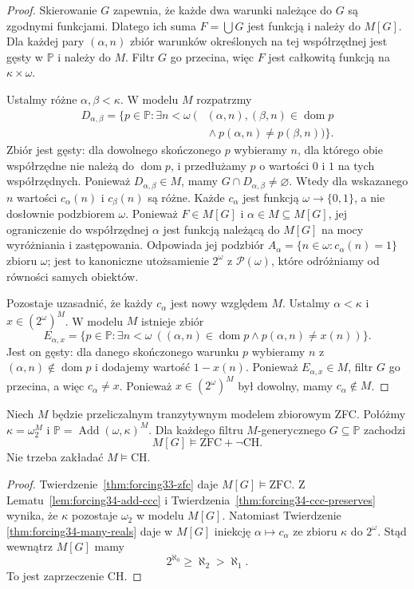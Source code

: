 \begin{proof}
Skierowanie $G$ zapewnia, że
każde dwa warunki należące
do $G$ są zgodnymi funkcjami.
Dlatego ich suma $F=\bigcup G$
jest funkcją i należy do $M[G]$.
Dla każdej pary $(\alpha,n)$
zbiór warunków określonych
na tej współrzędnej jest
gęsty w $\mathbb P$ i należy
do $M$. Filtr $G$ go przecina,
więc $F$ jest całkowitą funkcją
na $\kappa\times\omega$.

Ustalmy różne $\alpha,\beta<\kappa$.
W modelu $M$ rozpatrzmy
\[
\begin{aligned}
 D_{\alpha,\beta}
  =\{p\in\mathbb P:\exists n<\omega\
  (&(\alpha,n),(\beta,n)
            \in\operatorname{dom}p\\
   &{}\land p(\alpha,n)\ne p(\beta,n))\}.
\end{aligned}
\]
Zbiór jest gęsty: dla dowolnego
skończonego $p$ wybieramy
$n$, dla którego obie współrzędne
nie należą do $\operatorname{dom}p$,
i przedłużamy $p$ o wartości
$0$ i $1$ na tych współrzędnych.
Ponieważ $D_{\alpha,\beta}\in M$,
mamy $G\cap D_{\alpha,\beta}\ne\varnothing$.
Wtedy dla wskazanego $n$
wartości $c_\alpha(n)$ i
$c_\beta(n)$ są różne.
Każde $c_\alpha$ jest funkcją
$\omega\to\{0,1\}$, a nie dosłownie
podzbiorem $\omega$. Ponieważ
$F\in M[G]$ i $\alpha\in M\subseteq M[G]$,
jej ograniczenie do współrzędnej
$\alpha$ jest funkcją należącą
do $M[G]$ na mocy wyróżniania
i zastępowania. Odpowiada jej
podzbiór
$A_\alpha=\{n\in\omega:c_\alpha(n)=1\}$
zbioru $\omega$; jest to
kanoniczne utożsamienie
$2^\omega$ z $\mathcal P(\omega)$,
które odróżniamy od równości
samych obiektów.

Pozostaje uzasadnić, że każdy
$c_\alpha$ jest nowy względem $M$.
Ustalmy $\alpha<\kappa$ i
$x\in(2^\omega)^M$. W modelu $M$
istnieje zbiór
\[
 E_{\alpha,x}=
 \{p\in\mathbb P:\exists n<\omega\
  ((\alpha,n)\in\operatorname{dom}p
         \land p(\alpha,n)\ne x(n))\}.
\]
Jest on gęsty: dla danego
skończonego warunku $p$
wybieramy $n$ z
$(\alpha,n)\notin\operatorname{dom}p$
i dodajemy wartość $1-x(n)$.
Ponieważ $E_{\alpha,x}\in M$,
filtr $G$ go przecina, a więc
$c_\alpha\neq x$. Ponieważ
$x\in(2^\omega)^M$ był dowolny,
mamy $c_\alpha\notin M$.
\end{proof}

\begin{twierdzenie}
\label{thm:forcing34-not-ch}
Niech $M$ będzie przeliczalnym
tranzytywnym modelem zbiorowym ZFC.
Połóżmy
$\kappa=\omega_2^M$ i
$\mathbb P=\operatorname{Add}(\omega,\kappa)^M$.
Dla każdego filtru $M$-generycznego
$G\subseteq\mathbb P$ zachodzi
\[
 M[G]\models\mathrm{ZFC}+\neg\mathrm{CH}.
\]
Nie trzeba zakładać $M\models\mathrm{CH}$.
\end{twierdzenie}
\begin{proof}
Twierdzenie~\ref{thm:forcing33-zfc}
daje $M[G]\models\mathrm{ZFC}$.
Z Lematu~\ref{lem:forcing34-add-ccc}
i Twierdzenia~\ref{thm:forcing34-ccc-preserves}
wynika, że $\kappa$ pozostaje
$\omega_2$ w modelu $M[G]$.
Natomiast Twierdzenie
\ref{thm:forcing34-many-reals}
daje w $M[G]$ iniekcję
$\alpha\mapsto c_\alpha$
ze zbioru $\kappa$ do $2^\omega$.
Stąd wewnątrz $M[G]$ mamy
\[
 2^{\aleph_0}\geq\aleph_2>\aleph_1.
\]
To jest zaprzeczenie CH.
\end{proof}

